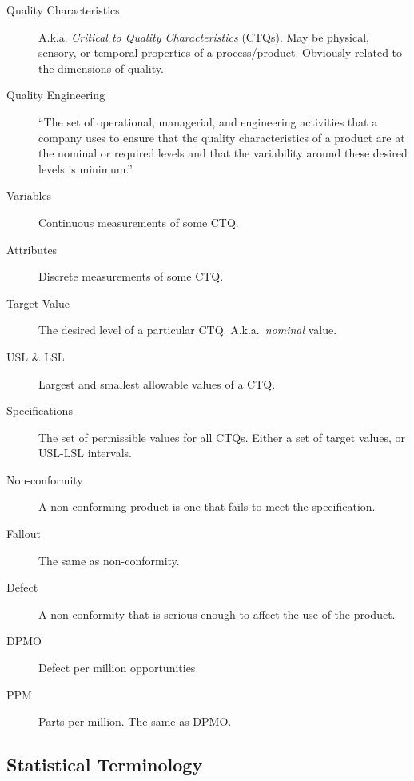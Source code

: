 \begin{tcolorbox}[breakable]

\begin{description}
\item [Quality Characteristics] A.k.a. \emph{Critical to Quality Characteristics} (CTQs). May be physical, sensory, or temporal properties of a process/product. Obviously related to the dimensions of quality. 

\item [Quality Engineering] ``The set of operational, managerial, and engineering activities
that a company uses to ensure that the quality characteristics of a product are at the nominal
or required levels and that the variability around these desired levels is minimum.'' \citep{montgomery_introduction_2007}
\item [Variables] Continuous measurements of some CTQ.
\item [Attributes] Discrete measurements of some CTQ.
\item [Target Value] The desired level of a particular CTQ. A.k.a.\ \emph{nominal} value. 
\item [USL \& LSL] Largest and smallest allowable values of a CTQ.
\item [Specifications] The set of permissible values for all CTQs. Either a set of target values, or USL-LSL intervals. 
\item [Non-conformity] A non conforming product is one that fails to meet the specification.
\item [Fallout] The same as non-conformity.
\item [Defect] A non-conformity that is serious enough to affect the use of the product.
\item [DPMO] Defect per million opportunities. 
\item [PPM] Parts per million. The same as DPMO.
\end{description}

\end{tcolorbox}



\subsection{Statistical Terminology}
\label{sec:terminology_statistical}

